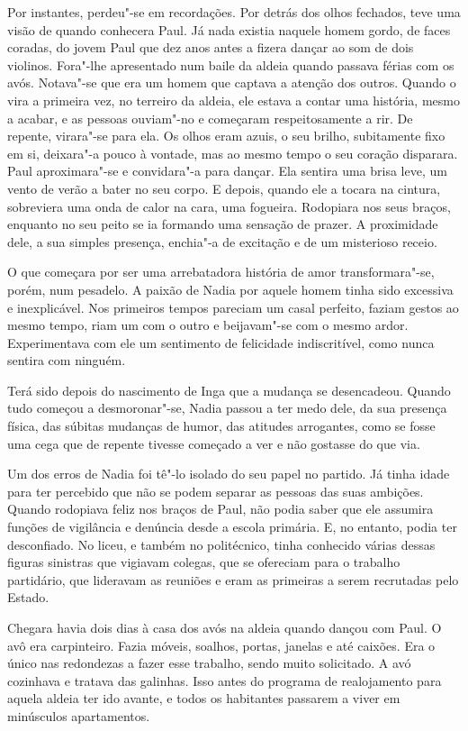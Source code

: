 Por instantes, perdeu"-se em recordações. Por detrás dos olhos fechados,
teve uma visão de quando conhecera Paul. Já nada existia naquele homem
gordo, de faces coradas, do jovem Paul que dez anos antes a fizera
dançar ao som de dois violinos. Fora"-lhe apresentado num baile da aldeia
quando passava férias com os avós. Notava"-se que era um homem que
captava a atenção dos outros. Quando o vira a primeira vez, no terreiro
da aldeia, ele estava a contar
uma história, mesmo a acabar, e as pessoas ouviam"-no e começaram
respeitosamente a rir. De repente, virara"-se para ela. Os olhos eram
azuis, o seu brilho, subitamente fixo em si, deixara"-a pouco à vontade,
mas ao mesmo tempo o seu coração disparara. Paul aproximara"-se e
convidara"-a para dançar. Ela sentira uma brisa leve, um vento de verão a
bater no seu corpo. E depois, quando ele a tocara na cintura, sobreviera
uma onda de calor na cara, uma fogueira. Rodopiara nos seus braços,
enquanto no seu peito se ia formando uma sensação de prazer. A proximidade dele, a sua simples presença, enchia"-a de excitação e de um
misterioso receio.

O que começara por ser uma arrebatadora história de amor
transformara"-se, porém, num pesadelo. A paixão de Nadia por aquele homem
tinha sido excessiva e inexplicável. Nos primeiros tempos pareciam um
casal perfeito, faziam gestos ao mesmo tempo, riam um com o outro e
beijavam"-se com o mesmo ardor. Experimentava com ele um sentimento de
felicidade indiscritível, como nunca sentira com ninguém.

Terá sido depois do nascimento de Inga que a mudança se desencadeou.
Quando tudo começou a desmoronar"-se, Nadia passou a ter medo dele, da
sua presença física, das súbitas mudanças de humor, das atitudes
arrogantes, como se fosse uma cega que de repente tivesse começado a ver
e não gostasse do que via.

Um dos erros de Nadia foi tê"-lo isolado do seu papel no partido. Já
tinha idade para ter percebido que não se podem separar as pessoas das
suas ambições. Quando rodopiava feliz nos braços de Paul, não podia
saber que ele assumira funções de vigilância e denúncia desde a escola primária.
E, no entanto, podia ter desconfiado. No liceu, e também no politécnico,
tinha conhecido várias dessas figuras sinistras que vigiavam colegas,
que se ofereciam para o trabalho partidário, que lideravam as reuniões
e eram as primeiras a serem recrutadas pelo Estado.

Chegara havia dois dias à casa dos avós na aldeia quando dançou com
Paul. O avô era carpinteiro. Fazia móveis, soalhos, portas, janelas e
até caixões. Era o único nas redondezas a fazer esse trabalho, sendo
muito solicitado. A avó cozinhava e tratava das galinhas. Isso antes
do programa de realojamento para aquela aldeia ter ido avante, e todos
os habitantes passarem a viver em minúsculos apartamentos.

